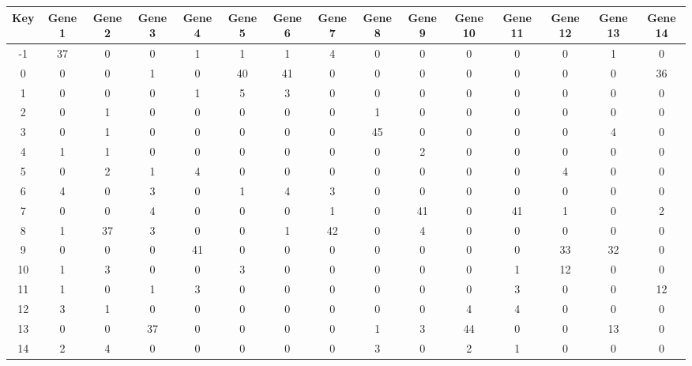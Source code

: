 \begin{tabular}{|c|c|c|c|c|c|c|c|c|c|c|c|c|c|c|}
\hline
Key & Gene 1 & Gene 2 & Gene 3 & Gene 4 & Gene 5 & Gene 6 & Gene 7 & Gene 8 & Gene 9 & Gene 10 & Gene 11 & Gene 12 & Gene 13 & Gene 14 \\
\hline
-1 & 37 & 0 & 0 & 1 & 1 & 1 & 4 & 0 & 0 & 0 & 0 & 0 & 1 & 0 \\
0 & 0 & 0 & 1 & 0 & 40 & 41 & 0 & 0 & 0 & 0 & 0 & 0 & 0 & 36 \\
1 & 0 & 0 & 0 & 1 & 5 & 3 & 0 & 0 & 0 & 0 & 0 & 0 & 0 & 0 \\
2 & 0 & 1 & 0 & 0 & 0 & 0 & 0 & 1 & 0 & 0 & 0 & 0 & 0 & 0 \\
3 & 0 & 1 & 0 & 0 & 0 & 0 & 0 & 45 & 0 & 0 & 0 & 0 & 4 & 0 \\
4 & 1 & 1 & 0 & 0 & 0 & 0 & 0 & 0 & 2 & 0 & 0 & 0 & 0 & 0 \\
5 & 0 & 2 & 1 & 4 & 0 & 0 & 0 & 0 & 0 & 0 & 0 & 4 & 0 & 0 \\
6 & 4 & 0 & 3 & 0 & 1 & 4 & 3 & 0 & 0 & 0 & 0 & 0 & 0 & 0 \\
7 & 0 & 0 & 4 & 0 & 0 & 0 & 1 & 0 & 41 & 0 & 41 & 1 & 0 & 2 \\
8 & 1 & 37 & 3 & 0 & 0 & 1 & 42 & 0 & 4 & 0 & 0 & 0 & 0 & 0 \\
9 & 0 & 0 & 0 & 41 & 0 & 0 & 0 & 0 & 0 & 0 & 0 & 33 & 32 & 0 \\
10 & 1 & 3 & 0 & 0 & 3 & 0 & 0 & 0 & 0 & 0 & 1 & 12 & 0 & 0 \\
11 & 1 & 0 & 1 & 3 & 0 & 0 & 0 & 0 & 0 & 0 & 3 & 0 & 0 & 12 \\
12 & 3 & 1 & 0 & 0 & 0 & 0 & 0 & 0 & 0 & 4 & 4 & 0 & 0 & 0 \\
13 & 0 & 0 & 37 & 0 & 0 & 0 & 0 & 1 & 3 & 44 & 0 & 0 & 13 & 0 \\
14 & 2 & 4 & 0 & 0 & 0 & 0 & 0 & 3 & 0 & 2 & 1 & 0 & 0 & 0 \\
\hline
\end{tabular}